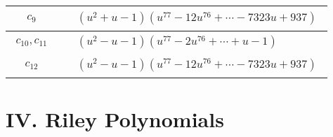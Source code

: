 \documentclass[1p]{elsarticle_modified}
\theoremstyle{definition}
\begin{document}
\begin{tabular}{m{50pt}|m{274pt}}
\hline $$\begin{aligned}c_{9}\end{aligned}$$&$\begin{aligned}
&(u^2+u-1)(u^{77}-12 u^{76}+\cdots-7323 u+937)
\end{aligned}$\\
\hline $$\begin{aligned}c_{10},c_{11}\end{aligned}$$&$\begin{aligned}
&(u^2- u-1)(u^{77}-2 u^{76}+\cdots+u-1)
\end{aligned}$\\
\hline $$\begin{aligned}c_{12}\end{aligned}$$&$\begin{aligned}
&(u^2- u-1)(u^{77}-12 u^{76}+\cdots-7323 u+937)
\end{aligned}$\\
\hline
\end{tabular}\newpage\renewcommand{\arraystretch}{1}
\centering \section*{ IV. Riley Polynomials}
\end{document}
